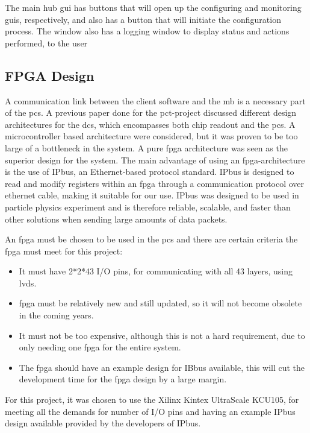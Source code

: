 \documentclass[main.tex]{subfiles}
\begin{document}
The main hub \gls{gui} has buttons that will open up the configuring and monitoring \gls{gui}s, respectively, and also has a button that will initiate the configuration process. The window also has a logging window to display status and actions performed, to the user

\subsection{FPGA Design}
\label{section: fpga_design}

A communication link between the client software and the \gls{mb} is a necessary part of the \gls{pcs}. A previous paper done for the \gls{pct}-project discussed different design architectures for the \gls{dcs}, which encompasses both chip readout and the \gls{pcs}. A microcontroller based architecture were considered, but it was proven to be too large of a bottleneck in the system. A pure \gls{fpga} architecture was seen as the superior design for the system. The main advantage of using an \gls{fpga}-architecture is the use of IPbus, an Ethernet-based protocol standard. IPbus is designed to read and modify registers within an \gls{fpga} through a communication protocol over ethernet cable, making it suitable for our use.  IPbus was designed to be used in particle physics experiment and is therefore reliable, scalable, and faster than other solutions when sending large amounts of data packets.

An \gls{fpga} must be chosen to be used in the \gls{pcs} and there are certain criteria the \gls{fpga} must meet for this project:

\begin{itemize}
    \item It must have 2*2*43 I/O pins, for communicating with all 43 layers, using \acrshort{lvds}.
    \item \gls{fpga} must be relatively new and still updated, so it will not become obsolete in the coming years.
    \item It must not be too expensive, although this is not a hard requirement, due to only needing one \gls{fpga} for the entire system.
    \item The \gls{fpga} should have an example design for IBbus available, this will cut the development time for the \gls{fpga} design by a large margin.
\end{itemize}

For this project, it was chosen to use the Xilinx Kintex UltraScale KCU105, for meeting all the demands for number of I/O pins and having an example IPbus design available provided by the developers of IPbus.
\end{document}
